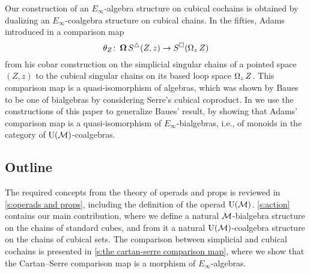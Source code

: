 Our construction of an $E_\infty$-algebra structure on cubical cochains is obtained by dualizing an $E_\infty$-coalgebra structure on cubical chains.
In the fifties, Adams introduced in \cite{adams1956cobar} a comparison map
\[
\theta_Z \colon \operatorname{\mathbf{\Omega}} S^\triangle(Z,z) \to S^\square(\operatorname{\Omega}_z Z)
\]
from his cobar construction on the simplicial singular chains of a pointed space $(Z,z)$ to the cubical singular chains on its based loop space $\operatorname{\Omega}_z Z$.
This comparison map is a quasi-isomorphism of algebras, which was shown by Baues \cite{baues1998hopf} to be one of bialgebras by considering Serre's cubical coproduct.
In \cite{medina2021cobar} we use the constructions of this paper to generalize Baues' result, by showing that Adams' comparison map is a quasi-isomorphism of $E_\infty$-bialgebras, i.e., of monoids in the category of ${\operatorname{U}(\mathcal{M})}$-coalgebras.

\subsection*{Outline}

The required concepts from the theory of operads and props is reviewed in \cref{s:operads and props}, including the definition of the operad ${\operatorname{U}(\mathcal{M})}$.
\cref{s:action} contains our main contribution, where we define a natural $\mathcal{M}$-bialgebra structure on the chains of standard cubes, and from it a natural ${\operatorname{U}(\mathcal{M})}$-coalgebra structure on the chains of cubical sets.
The comparison between simplicial and cubical cochains is presented in \cref{s:the cartan-serre comparison map}, where we show that the Cartan--Serre comparison map is a morphism of $E_\infty$-algebras.